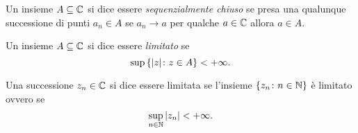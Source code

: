 \begin{definition}
Un insieme $A\subseteq {\mathbb C}$ si dice
essere \emph{sequenzialmente chiuso}%
%
%
se presa una qualunque successione
di punti $a_n\in A$ se $a_n \to a$ per qualche $a\in {\mathbb C}$
allora $a\in A$.
\end{definition}

\begin{definition}[limitatezza]
Un insieme $A\subseteq {\mathbb C}$ si dice essere \emph{limitato}%
%
se
\[
  \sup {\left\{  {\left|z\right|}\colon z \in A \right\}} < +\infty.
\]

Una successione $z_n\in {\mathbb C}$ si dice essere limitata se l'insieme
${\left\{ z_n\colon n\in {\mathbb N} \right\}}$ è limitato ovvero se
\[
  \sup_{n\in {\mathbb N}} {\left|z_n\right|} < +\infty.
\]
\end{definition}

\begin{comment} 
\begin{definition}[disco]
Dato $R\ge 0$ si può definire il disco complesso di raggio $R$ come
l'insieme $D_R\subset \CC$ definito da
\[
  D_R = \ENCLOSE{z\in \CC\colon \abs{z} \le R}.
\]
Geometricamente si tratta di un cerchio pieno di raggio $R$ centrato in $0$.
\end{definition}

\begin{theorem}[il disco è chiuso e limitato]
Per ogni $R\in [0,+\infty)$ il disco $D_R$ è un sottoinsieme di $C$ non vuoto, chiuso e limitato.
\end{theorem}
%
\begin{proof}
Per ogni $R\ge 0$ si ha $0\in D_R$ e quindi $D_R$ non è mai vuoto.

Che $D_R$ sia limitato è pure ovvio,
in quanto dato $z\in D_R$ si ha per
definizione $\abs{z}\le R$ e dunque $\sup_{z\in D_R} \abs{z} = R < +\infty$.

Per dimostrare che $D_R$ è chiuso consideriamo una qualunque successione $a_n \in D_R$. Sappiamo dunque che $\abs{a_n} \le R$
cioè $R-\abs{a_n} \ge 0$ per ogni $n\in \NN$.
Per la continuità del modulo sappiamo che $R-\abs{a_n}\to R-\abs{a}$
e per il teorema della permanenza del segno possiamo concludere che $R-\abs{a}\ge 0$ cioè che $\abs{a}\le R$ ovvero $a \in D_R$. Come volevamo dimostrare.
\end{proof}
\end{comment}

